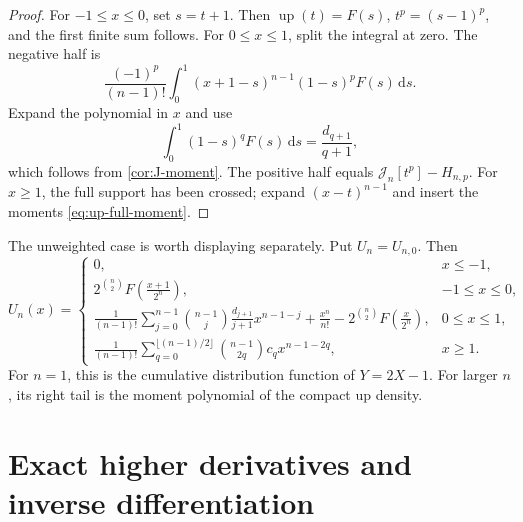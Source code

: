 \documentclass[11pt,oneside]{article}
\theoremstyle{definition}
\theoremstyle{remark}
\newcommand{\Up}{\operatorname{up}}
\newcommand{\dd}{\,\mathrm d}
\newcommand{\Jn}{\mathcal J}
\newcommand{\1}{\mathbf 1}
\begin{document}
\begin{proof}
For \(-1\leq x\leq0\), set \(s=t+1\).  Then
\(\Up(t)=F(s)\), \(t^p=(s-1)^p\), and the first finite sum follows.
For \(0\leq x\leq1\), split the integral at zero.  The negative half is
\[
 \frac{(-1)^p}{(n-1)!}\int_0^1(x+1-s)^{n-1}(1-s)^pF(s)\dd s.
\]
Expand the polynomial in \(x\) and use
\[
 \int_0^1(1-s)^qF(s)\dd s=\frac{d_{q+1}}{q+1},
\]
which follows from \cref{cor:J-moment}.  The positive half equals
\(\Jn_n[t^p]-H_{n,p}\).  For \(x\geq1\), the full support has been crossed;
expand \((x-t)^{n-1}\) and insert the moments
\eqref{eq:up-full-moment}.
\end{proof}

The unweighted case is worth displaying separately.  Put \(U_n=U_{n,0}\).
Then
\begin{equation}
 U_n(x)=
 \begin{cases}
 0,&x\leq-1,\\
 \displaystyle 2^{\binom n2}F\!\left(\frac{x+1}{2^n}\right),
 &-1\leq x\leq0,\\[2mm]
 \displaystyle
 \frac1{(n-1)!}\sum_{j=0}^{n-1}\binom{n-1}{j}
 \frac{d_{j+1}}{j+1}x^{n-1-j}
 +\frac{x^n}{n!}
 -2^{\binom n2}F\!\left(\frac{x}{2^n}\right),
 &0\leq x\leq1,\\[4mm]
 \displaystyle
 \frac1{(n-1)!}\sum_{q=0}^{\lfloor(n-1)/2\rfloor}
 \binom{n-1}{2q}c_qx^{n-1-2q},&x\geq1.
 \end{cases}                                                    \label{eq:up-unweighted-n}
\end{equation}
For \(n=1\), this is the cumulative distribution function of \(Y=2X-1\).
For larger \(n\), its right tail is the moment polynomial of the compact up
density.

\section{Exact higher derivatives and inverse differentiation}
\end{document}
